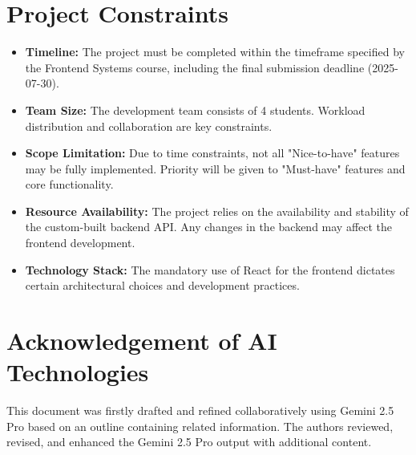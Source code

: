 \documentclass[a4paper,11pt]{article}
\begin{document}
\section{Project Constraints}
\begin{itemize}
    \item \textbf{Timeline:} The project must be completed within the timeframe specified by the Frontend Systems course, including the final submission deadline (2025-07-30).
    \item \textbf{Team Size:} The development team consists of 4 students. Workload distribution and collaboration are key constraints.
    \item \textbf{Scope Limitation:} Due to time constraints, not all "Nice-to-have" features may be fully implemented. Priority will be given to "Must-have" features and core functionality.
    \item \textbf{Resource Availability:} The project relies on the availability and stability of the custom-built backend API. Any changes in the backend may affect the frontend development.
    \item \textbf{Technology Stack:} The mandatory use of React for the frontend dictates certain architectural choices and development practices.
\end{itemize}

\section*{Acknowledgement of AI Technologies}
This document was firstly drafted and refined collaboratively using Gemini 2.5 Pro based on an outline containing related information. The authors reviewed, revised, and enhanced the Gemini 2.5 Pro
output with additional content. 
\end{document}
